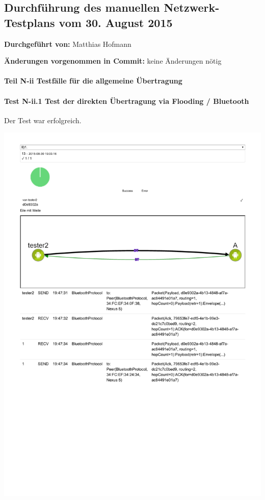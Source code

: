 \subsection{Durchführung des manuellen Netzwerk-Testplans vom 30. August 2015}

\textbf{Durchgeführt von:} Matthias Hofmann

\textbf{Änderungen vorgenommen in Commit:} keine Änderungen nötig

\paragraph{Teil N-ii Testfälle für die allgemeine Übertragung}

\paragraph{Test N-ii.1 Test der direkten Übertragung via Flooding / Bluetooth}

Der Test war erfolgreich.

\includegraphics[trim=0 180 0 0,clip,scale=0.8]{belege/manuelle-tests/netzwerk/Dashboardauszuege/Netzwerktest_II-1.pdf}
\clearpage

